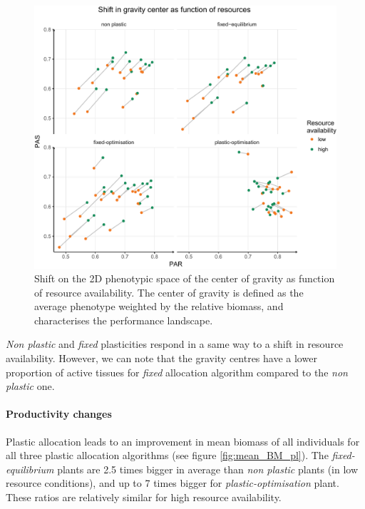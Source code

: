 \begin{figure}\label{fig:gravity_shift_resource}
\includegraphics[width = \textwidth]{./2_PP/Figures/Landscape/ld_gravity_resourceall.pdf}
\caption{Shift on the 2D phenotypic space of the center of gravity as function of resource availability. The center of gravity is defined as the average phenotype weighted by the relative biomass, and characterises the performance landscape.}
\end{figure}

\textit{Non plastic} and \textit{fixed} plasticities respond in a same way to a shift in resource availability. However, we can note that the gravity centres have a lower proportion of active tissues for \textit{fixed} allocation algorithm compared to the \textit{non plastic} one.


\paragraph{Productivity changes}

Plastic allocation leads to an improvement in mean biomass of all individuals for all three plastic allocation algorithms (see figure \ref{fig:mean_BM_pl}). The \textit{fixed-equilibrium} plants are 2.5 times bigger in average than \textit{non plastic} plants (in low resource conditions), and up to 7 times bigger for \textit{plastic-optimisation} plant. These ratios are relatively similar for high resource availability. 

